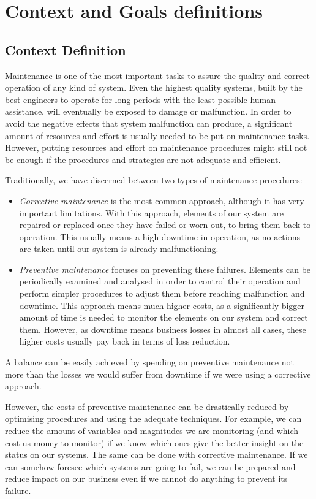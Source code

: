 \chapter{Context and Goals definitions}
\label{chap:context_and_goals}

\section{Context Definition}
\label{sec:context}
Maintenance is one of the most important tasks to assure the quality and correct operation of any kind of system. Even the highest quality systems, built by the best engineers to operate for long periods with the least possible human assistance, will eventually be exposed to damage or malfunction. In order to avoid the negative effects that system malfunction can produce, a significant amount of resources and effort is usually needed to be put on maintenance tasks. However, putting resources and effort on maintenance procedures might still not be enough if the procedures and strategies are not adequate and efficient.

Traditionally, we have discerned between two types of maintenance procedures:
\begin{itemize}
\item \emph{Corrective maintenance} is the most common approach, although it has very important limitations. With this approach, elements of our system are repaired or replaced once they have failed or worn out, to bring them back to operation. This usually means a high downtime in operation, as no actions are taken until our system is already malfunctioning.

\item \emph{Preventive maintenance} focuses on preventing these failures. Elements can be periodically examined and analysed in order to control their operation and perform simpler procedures to adjust them before reaching malfunction and downtime. This approach means much higher costs, as a significantly bigger amount of time is needed to monitor the elements on our system and correct them. However, as downtime means business losses in almost all cases, these higher costs usually pay back in terms of loss reduction.
\end{itemize}

A balance can be easily achieved by spending on preventive maintenance not more than the losses we would suffer from downtime if we were using a corrective approach.

However, the costs of preventive maintenance can be drastically reduced by optimising procedures and using the adequate techniques. For example, we can reduce the amount of variables and magnitudes we are monitoring (and which cost us money to monitor) if we know which ones give the better insight on the status on our systems. The same can be done with corrective maintenance. If we can somehow foresee which systems are going to fail, we can be prepared and reduce impact on our business even if we cannot do anything to prevent its failure.

